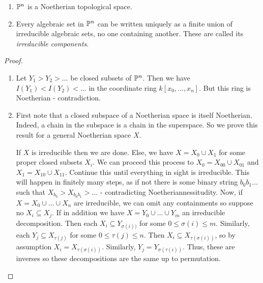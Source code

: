 \label{1.2.5}

\begin{enumerate}
    \item $\P^n$ is a Noetherian topological space.
    
    \item Every algebraic set in $\P^n$ can be written uniquely as a finite union of irreducible algebraic sets, no one containing another. These are called its \textit{irreducible components}.
\end{enumerate}

\begin{proof}
\begin{enumerate}
	\item Let $Y_1 > Y_2 > \dots$ be closed subsets of $\P^n$. Then we have $I(Y_1) < I(Y_2) < \dots$ in the coordinate ring $k[x_0, \dots, x_n]$. But this ring is Noetherian - contradiction.
	
	\item First note that a closed subspace of a Noetherian space is itself Noetherian. Indeed, a chain in the subspace is a chain in the superspace. So we prove this result for a general Noetherian space $X$.
	
		If $X$ is irreducible then we are done. Else, we have $X=X_0 \cup X_1$ for some proper closed subsets $X_i$. We can proceed this process to $X_0 = X_{00} \cup X_{01}$ and $X_1 =X_{10} \cup X_{11}$. Continue this until everything in sight is irreducible. This will happen in finitely many steps, as if not there is some binary string $b_0 b_1 \dots$ such that $X_{b_0} > X_{b_0 b_1} > \dots$ - contradicting Noetheriannessitudity. Now, if $X = X_0 \cup \dots \cup X_n$ are irreducible, we can omit any containments so suppose no $X_i \subseteq X_j$. If in addition we have $X = Y_0 \cup \dots \cup Y_m$ an irreducible decomposition. Then each $X_i \subseteq Y_{\sigma(i))}$ for some $0 \leq \sigma(i) \leq m$. Similarly, each $Y_j \subseteq X_{\tau(j)}$ for some $0 \leq \tau(j)\leq n$. Then $X_i \subseteq X_{\tau(\sigma(i))}$, so by assumption $X_i = X_{\tau(\sigma(i))}$. Similarly, $Y_j = Y_{\sigma(\tau(i))}$. Thus, these are inverses so these decompositions are the same up to permutation.
\end{enumerate}
\end{proof}

